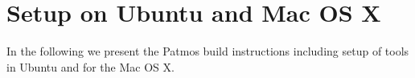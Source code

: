 \documentclass[a4paper,fontsize=10pt,twoside,DIV15,BCOR12mm,headinclude=true,footinclude=false,pagesize,bibtotoc]{scrbook}
\begin{document}
%
%
%
%
%
%
%
%

\section{Setup on Ubuntu and Mac OS X}

In the following we present the Patmos build instructions including setup of
tools in Ubuntu and for the Mac OS X.
\end{document}
